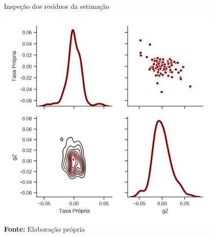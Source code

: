 \begin{figure}[H]
	\centering
	\caption{Inspeção dos resíduos da estimação}
	\label{residuos}
	\includegraphics[height=.4\textheight]{../../Modelo/SeriesTemporais/figs/Residuos_4VECM.png}
	\caption*{\textbf{Fonte:} Elaboração própria}
\end{figure}


